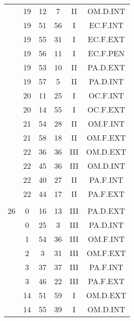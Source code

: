 \documentclass[12pt, a4paper]{article}
\begin{document}
\begin{multicols}{3}
{\begin{tabular}{c c c c c c}
	 	 	 	 & 19 & 12 & 7 & II & OM.D.INT\\%
	 	 	 	 & 19 & 51 & 56 & I & EC.F.INT\\%
	 	 	 	 & 19 & 55 & 31 & I & EC.F.EXT\\%
	 	 	 	 & 19 & 56 & 11 & I & EC.F.PEN\\%
	 	 	 	 & 19 & 53 & 10 & II & PA.D.EXT\\%
	 	 	 	 & 19 & 57 & 5 & II & PA.D.INT\\%
	 	 	 	 & 20 & 11 & 25 & I & OC.F.INT\\%
	 	 	 	 & 20 & 14 & 55 & I & OC.F.EXT\\%
	 	 	 	 & 21 & 54 & 28 & II & OM.F.INT\\%
	 	 	 	 & 21 & 58 & 18 & II & OM.F.EXT\\%
	 	 	 	 & 22 & 36 & 36 & III & OM.D.EXT\\%
	 	 	 	 & 22 & 45 & 36 & III & OM.D.INT\\%
	 	 	 	 & 22 & 40 & 27 & II & PA.F.INT\\%
	 	 	 	 & 22 & 44 & 17 & II & PA.F.EXT\\%
	 	 	 	 & & & & & \\%
	 	 	 	26 & 0 & 16 & 13 & III & PA.D.EXT\\%
	 	 	 	 & 0 & 25 & 3 & III & PA.D.INT\\%
	 	 	 	 & 1 & 54 & 36 & III & OM.F.INT\\%
	 	 	 	 & 2 & 3 & 31 & III & OM.F.EXT\\%
	 	 	 	 & 3 & 37 & 37 & III & PA.F.INT\\%
	 	 	 	 & 3 & 46 & 22 & III & PA.F.EXT\\%
	 	 	 	 & 14 & 51 & 59 & I & OM.D.EXT\\%
	 	 	 	 & 14 & 55 & 39 & I & OM.D.INT\\%

\end{tabular}}
\end{multicols}
\end{document}
